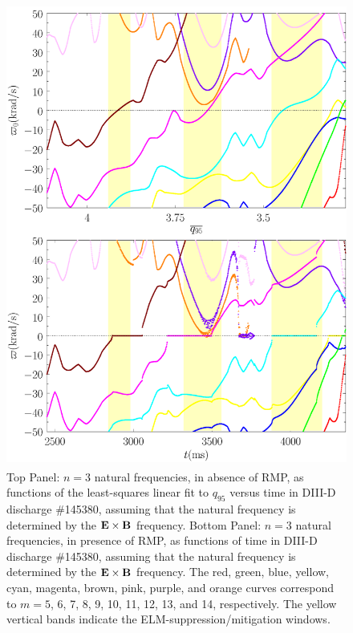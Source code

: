 \documentclass[12pt,prb,aps]{revtex4-1}
\begin{document}
\begin{figure}
\includegraphics[height=6in]{fig8.pdf}
\caption{Top Panel: $n=3$ natural frequencies, in absence of RMP, as functions of the least-squares linear fit to $q_{95}$ versus time
in   DIII-D discharge \#145380, assuming that the natural frequency is determined by the ${\bf E}\times {\bf B}$
frequency.
Bottom Panel:  $n=3$ natural frequencies, in presence of RMP, as functions of time
in   DIII-D discharge \#145380, assuming that the natural frequency is  determined by the ${\bf E}\times {\bf B}$
frequency. The red, green, blue, yellow, cyan, magenta, brown, pink,
purple, and orange  curves correspond to $m=5$, 6, 7, 8, 9, 10, 11, 12, 13, and 14, respectively. The yellow vertical bands indicate the ELM-suppression/mitigation windows.} \label{fig8}
\end{figure}
\end{document}
